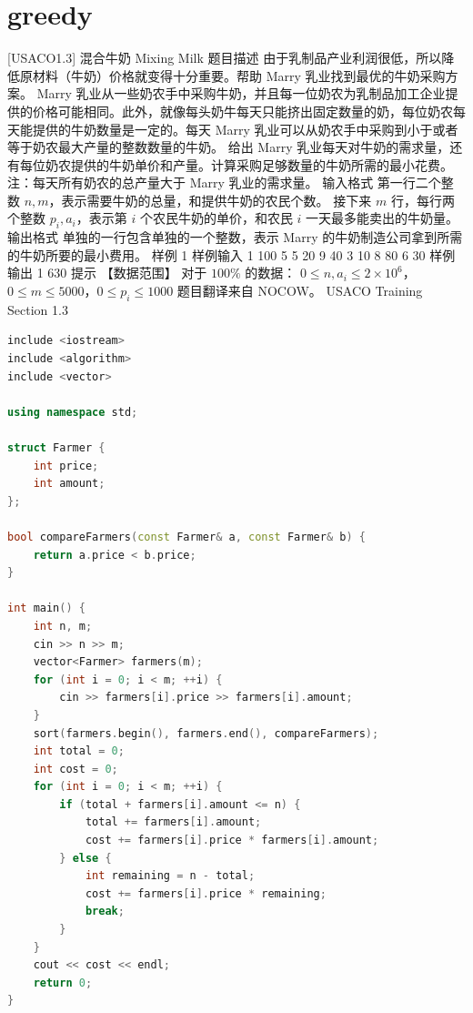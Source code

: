 \documentclass[12pt,twiside,a4paper]{ctexbook}
\numberwithin{chapter}{part}
\begin{document}
\section{greedy}
 [USACO1.3] 混合牛奶 Mixing Milk
 题目描述
由于乳制品产业利润很低，所以降低原材料（牛奶）价格就变得十分重要。帮助 Marry 乳业找到最优的牛奶采购方案。
Marry 乳业从一些奶农手中采购牛奶，并且每一位奶农为乳制品加工企业提供的价格可能相同。此外，就像每头奶牛每天只能挤出固定数量的奶，每位奶农每天能提供的牛奶数量是一定的。每天 Marry 乳业可以从奶农手中采购到小于或者等于奶农最大产量的整数数量的牛奶。
给出 Marry 乳业每天对牛奶的需求量，还有每位奶农提供的牛奶单价和产量。计算采购足够数量的牛奶所需的最小花费。
注：每天所有奶农的总产量大于 Marry 乳业的需求量。
 输入格式
第一行二个整数 $n,m$，表示需要牛奶的总量，和提供牛奶的农民个数。
接下来 $m$ 行，每行两个整数 $p_i,a_i$，表示第 $i$ 个农民牛奶的单价，和农民 $i$ 一天最多能卖出的牛奶量。
 输出格式
单独的一行包含单独的一个整数，表示 Marry 的牛奶制造公司拿到所需的牛奶所要的最小费用。
 样例 1
 样例输入 1
100 5
5 20
9 40
3 10
8 80
6 30
 样例输出 1
630
 提示
【数据范围】  
对于 $100\%$ 的数据：  
$0 \le n,a_i \le 2 \times 10^6$，$0\le m \le 5000$，$0 \le p_i \le 1000$
题目翻译来自 NOCOW。
USACO Training Section 1.3
\begin{lstlisting}[language=c++,breaklines=true]
include <iostream>
include <algorithm>
include <vector>

using namespace std;

struct Farmer {
    int price;
    int amount;
};

bool compareFarmers(const Farmer& a, const Farmer& b) {
    return a.price < b.price;
}

int main() {
    int n, m;
    cin >> n >> m;
    vector<Farmer> farmers(m);
    for (int i = 0; i < m; ++i) {
        cin >> farmers[i].price >> farmers[i].amount;
    }
    sort(farmers.begin(), farmers.end(), compareFarmers);
    int total = 0;
    int cost = 0;
    for (int i = 0; i < m; ++i) {
        if (total + farmers[i].amount <= n) {
            total += farmers[i].amount;
            cost += farmers[i].price * farmers[i].amount;
        } else {
            int remaining = n - total;
            cost += farmers[i].price * remaining;
            break;
        }
    }
    cout << cost << endl;
    return 0;
}
\end{lstlisting}
\end{document}
